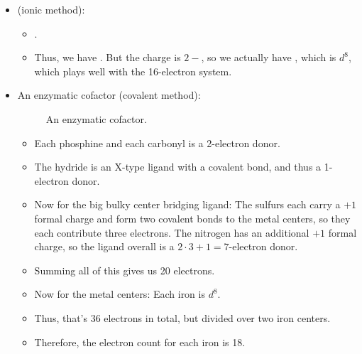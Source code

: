 \documentclass[../notes.tex]{subfiles}
\begin{document}
\begin{itemize}
\begin{itemize}
\begin{itemize}
        \end{itemize}
        \item {} (ionic method):
        \begin{itemize}
            \item {}.
            \item Thus, we have . But the charge is $2-$, so we actually have , which is $d^8$, which plays well with the 16-electron system.
        \end{itemize}
        \item An enzymatic cofactor (covalent method):
        \begin{figure}[h!]
            \centering
            \caption{An enzymatic cofactor.}
            \label{fig:e-count-enzymaticCofactor}
        \end{figure}
        \begin{itemize}
            \item Each phosphine and each carbonyl is a 2-electron donor.
            \item The hydride is an X-type ligand with a covalent bond, and thus a 1-electron donor.
            \item Now for the big bulky center bridging ligand: The sulfurs each carry a $+1$ formal charge and form two covalent bonds to the metal centers, so they each contribute three electrons. The nitrogen has an additional $+1$ formal charge, so the ligand overall is a $2\cdot 3+1=7$-electron donor.
            \item Summing all of this gives us 20 electrons.
            \item Now for the metal centers: Each iron is $d^8$.
            \item Thus, that's 36 electrons in total, but divided over two iron centers.
            \item Therefore, the electron count for each iron is 18.
        \end{itemize}
    \end{itemize}

\end{itemize}
\end{document}
